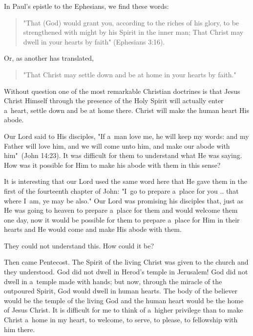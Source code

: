 \documentclass[a4paper,12pt]{article}
\begin{document}
\begin{multicols}{2}

In Paul's epistle to the Ephesians, we find these words: 

\begin{quote}
"That (God) would grant you, according to the riches of 
his glory, to be strengthened with might by his Spirit in 
the inner man; That Christ may dwell in your hearts by 
faith" (Ephesians 3:16).
\end{quote}

Or, as another has translated, 

\begin{quote}
"That Christ may settle down and be at home in your 
hearts by faith." 
\end{quote}

Without question one of the most remarkable Christian doctrines is that Jesus Christ Himself through the presence of the Holy Spirit will actually enter a~heart, settle down and be at home there. Christ will make the 
human heart His abode. 

Our Lord said to His disciples, "If a~man love me, he will keep my words: and my Father will love him, and we will come unto him, and make our abode with him"~(John 14:23). It was difficult for them to understand what He was saying. How was it possible for Him to make his abode with them in this sense? 

It is interesting that our Lord used the same word here that He gave them in the first of the fourteenth chapter of John: "I~go to prepare a~place for you .. that where I~am, ye may be also." Our Lord was promising his disciples that, just as He was going to heaven to prepare a~place for them and would welcome them one day, now it would be possible for them to prepare a~place for Him in their hearts and He would come and make His abode with them. 

They could not understand this. How could it be? 

Then came Pentecost. The Spirit of the living Christ was given to the church and they understood. God did not dwell in Herod's temple in Jerusalem! God did not dwell in a~temple made with hands; but now, through the miracle of the outpoured Spirit, God would dwell in human hearts. The body of the believer would be the temple of the living God and the human heart would be the home of Jesus Christ. It is difficult for me to think of a~higher privilege than to make Christ a~home in my heart, to welcome, to serve, to please, to fellowship with him there. 


\end{multicols}
\end{document}

